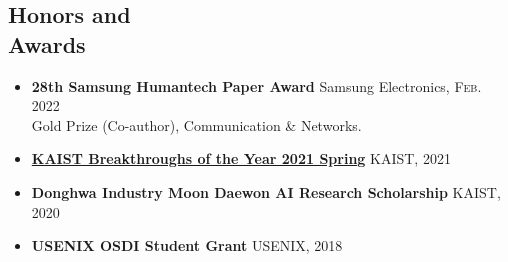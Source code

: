 \documentclass[margin,line,letter]{cv}
\begin{document}
\begin{resume}
\section{\sc Honors and\\ Awards \\}
\begin{itemize}[leftmargin=*]
	\item \textbf{28th Samsung Humantech Paper Award} \hfill Samsung Electronics, \textsc{Feb.} 2022 \\ Gold Prize (Co-author), Communication \& Networks. \par 
	\item \textbf{\href{https://breakthroughs.kaist.ac.kr/?post_no=1913}{KAIST Breakthroughs of the Year 2021 Spring}} \hfill KAIST, 2021 \par 
	\item \textbf{Donghwa Industry Moon Daewon AI Research Scholarship} \hfill KAIST, 2020 \par 
	\item \textbf{USENIX OSDI Student Grant} \hfill USENIX, 2018 \par 
\end{itemize}

\vspace{0.3cm}


\end{resume}
\end{document}
